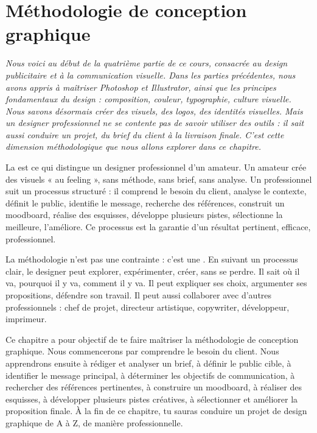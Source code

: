 
\chapter{Méthodologie de conception graphique}

\noindent
\textit{Nous voici au début de la quatrième partie de ce cours, consacrée au design publicitaire et à la communication visuelle. Dans les parties précédentes, nous avons appris à maîtriser Photoshop et Illustrator, ainsi que les principes fondamentaux du design : composition, couleur, typographie, culture visuelle. Nous savons désormais créer des visuels, des logos, des identités visuelles. Mais un designer professionnel ne se contente pas de savoir utiliser des outils : il sait aussi \emph{conduire un projet}, du brief du client à la livraison finale. C'est cette dimension méthodologique que nous allons explorer dans ce chapitre.}

\vspace{1em}

\noindent
La  est ce qui distingue un designer professionnel d'un amateur. Un amateur crée des visuels « au feeling », sans méthode, sans brief, sans analyse. Un professionnel suit un processus structuré : il comprend le besoin du client, analyse le contexte, définit le public, identifie le message, recherche des références, construit un moodboard, réalise des esquisses, développe plusieurs pistes, sélectionne la meilleure, l'améliore. Ce processus est la garantie d'un résultat pertinent, efficace, professionnel.

\vspace{1em}

\noindent
La méthodologie n'est pas une contrainte : c'est une . En suivant un processus clair, le designer peut explorer, expérimenter, créer, sans se perdre. Il sait où il va, pourquoi il y va, comment il y va. Il peut expliquer ses choix, argumenter ses propositions, défendre son travail. Il peut aussi collaborer avec d'autres professionnels : chef de projet, directeur artistique, copywriter, développeur, imprimeur.

\vspace{1em}

\noindent
Ce chapitre a pour objectif de te faire maîtriser la méthodologie de conception graphique. Nous commencerons par comprendre le besoin du client. Nous apprendrons ensuite à rédiger et analyser un brief, à définir le public cible, à identifier le message principal, à déterminer les objectifs de communication, à rechercher des références pertinentes, à construire un moodboard, à réaliser des esquisses, à développer plusieurs pistes créatives, à sélectionner et améliorer la proposition finale. À la fin de ce chapitre, tu sauras conduire un projet de design graphique de A à Z, de manière professionnelle.

